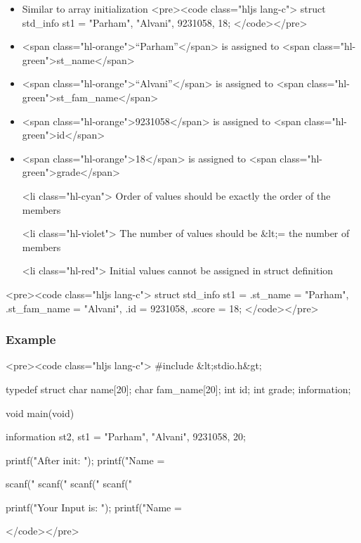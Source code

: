 \documentclass{../c-lecture}
\begin{document}
\begin{frame}
  \begin{frame}
    \begin{itemize}
      \item Similar to array initialization
      <pre><code class="hljs lang-c">
  struct std_info st1 = {"Parham", "Alvani", 9231058, 18};
      </code></pre>
      \item
        <span class="hl-orange">“Parham”</span> is assigned to
        <span class="hl-green">st_name</span>

      \item
        <span class="hl-orange">“Alvani”</span> is assigned to
        <span class="hl-green">st_fam_name</span>

      \item
        <span class="hl-orange">9231058</span> is assigned to
        <span class="hl-green">id</span>

      \item
        <span class="hl-orange">18</span> is assigned to
        <span class="hl-green">grade</span>

      <li class="hl-cyan">
        Order of values should be exactly the order of the members

      <li class="hl-violet">
        The number of values should be &lt;= the number of members

      <li class="hl-red">
        Initial values cannot be assigned in struct definition

    \end{itemize}
  \end{frame}
  \begin{frame}
    <pre><code class="hljs lang-c">
  struct std_info st1 = { .st_name = "Parham", .st_fam_name = "Alvani", .id = 9231058, .score = 18};
    </code></pre>
  \end{frame}
\end{frame}
\begin{frame}
  \frametitle{Example}
  <pre><code class="hljs lang-c">
#include &lt;stdio.h&gt;

typedef struct {
  char name[20];
  char fam_name[20];
  int id;
  int grade;
} information;

void main(void){
  information st2, st1 = {"Parham", "Alvani", 9231058, 20};

  printf("After init: \n");
  printf("Name = %

  scanf("%
  scanf("%
  scanf("%
  scanf("%

  printf("Your Input is: \n");
  printf("Name = %
}
  </code></pre>
\end{frame}
\end{document}
